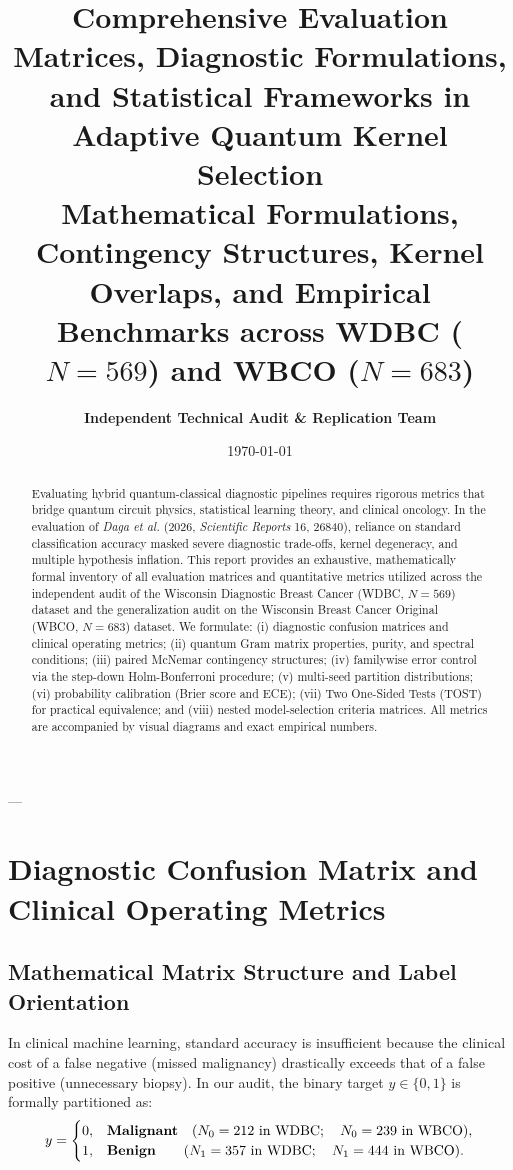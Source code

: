 \documentclass[11pt,a4paper]{article}
\title{\vspace{-1.5em}\LARGE\bfseries\sffamily\color{auditblue} Comprehensive Evaluation Matrices, Diagnostic Formulations, and Statistical Frameworks in Adaptive Quantum Kernel Selection\\[0.3em]
\large\mdseries\color{quantumblue} Mathematical Formulations, Contingency Structures, Kernel Overlaps, and Empirical Benchmarks across WDBC ($N=569$) and WBCO ($N=683$)}
\author{\textbf{Independent Technical Audit \& Replication Team}}
\date{\today}
\begin{document}
\maketitle

\begin{abstract}
Evaluating hybrid quantum-classical diagnostic pipelines requires rigorous metrics that bridge quantum circuit physics, statistical learning theory, and clinical oncology. In the evaluation of \textit{Daga et al.} (2026, \textit{Scientific Reports} 16, 26840), reliance on standard classification accuracy masked severe diagnostic trade-offs, kernel degeneracy, and multiple hypothesis inflation. This report provides an exhaustive, mathematically formal inventory of all evaluation matrices and quantitative metrics utilized across the independent audit of the Wisconsin Diagnostic Breast Cancer (WDBC, $N=569$) dataset and the generalization audit on the Wisconsin Breast Cancer Original (WBCO, $N=683$) dataset. We formulate: (i) diagnostic confusion matrices and clinical operating metrics; (ii) quantum Gram matrix properties, purity, and spectral conditions; (iii) paired McNemar contingency structures; (iv) familywise error control via the step-down Holm-Bonferroni procedure; (v) multi-seed partition distributions; (vi) probability calibration (Brier score and ECE); (vii) Two One-Sided Tests (TOST) for practical equivalence; and (viii) nested model-selection criteria matrices. All metrics are accompanied by visual diagrams and exact empirical numbers.
\end{abstract}

---

\section{Diagnostic Confusion Matrix and Clinical Operating Metrics}

\subsection{Mathematical Matrix Structure and Label Orientation}

In clinical machine learning, standard accuracy is insufficient because the clinical cost of a false negative (missed malignancy) drastically exceeds that of a false positive (unnecessary biopsy). In our audit, the binary target $y \in \{0, 1\}$ is formally partitioned as:
\begin{equation}
y = \begin{cases} 
0, & \text{\textbf{Malignant}} \quad (N_0 = 212 \text{ in WDBC}; \quad N_0 = 239 \text{ in WBCO}), \\
1, & \text{\textbf{Benign}} \quad\quad (N_1 = 357 \text{ in WDBC}; \quad N_1 = 444 \text{ in WBCO}).
\end{cases}
\end{equation}
\end{document}
